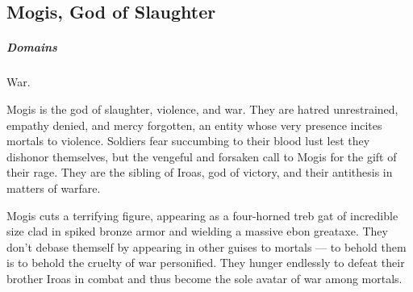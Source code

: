 
\vspace{13.5cm}

\subsection*{Mogis, God of Slaughter} \label{ssec::mogis}
    \subparagraph{Domains} War.

    Mogis is the god of slaughter, violence, and war.
    They are hatred unrestrained, empathy denied, and mercy forgotten, an entity whose very presence incites mortals to violence.
    Soldiers fear succumbing to their blood lust lest they dishonor themselves, but the vengeful and forsaken call to Mogis for the gift of their rage.
    They are the sibling of Iroas, god of victory, and their antithesis in matters of warfare.


    Mogis cuts a terrifying figure, appearing as a four-horned treb gat of incredible size clad in spiked bronze armor and wielding a massive ebon greataxe.
    They don't debase themself by appearing in other guises to mortals --- to behold them is to behold the cruelty of war personified.
    They hunger endlessly to defeat their brother Iroas in combat and thus become the sole avatar of war among mortals.

